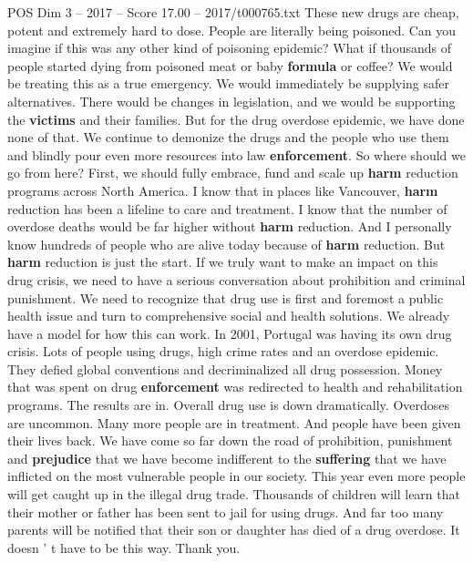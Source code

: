 \begin{textsample}{POS Dim 3 – 2017 – Score 17.00 – 2017/t000765.txt}
These new drugs are cheap, potent and extremely hard to dose.
People are literally being poisoned.
Can you imagine if this was any other kind of poisoning epidemic?
What if thousands of people started dying from poisoned meat or baby \textbf{formula} or coffee?
We would be treating this as a true emergency.
We would immediately be supplying safer alternatives.
There would be changes in legislation, and we would be supporting the \textbf{victims} and their families.
But for the drug overdose epidemic, we have done none of that.
We continue to demonize the drugs and the people who use them and blindly pour even more resources into law \textbf{enforcement}.
So where should we go from here?
First, we should fully embrace, fund and scale up \textbf{harm} reduction programs across North America.
I know that in places like Vancouver, \textbf{harm} reduction has been a lifeline to care and treatment.
I know that the number of overdose deaths would be far higher without \textbf{harm} reduction.
And I personally know hundreds of people who are alive today because of \textbf{harm} reduction.
But \textbf{harm} reduction is just the start.
If we truly want to make an impact on this drug crisis, we need to have a serious conversation about prohibition and criminal punishment.
We need to recognize that drug use is first and foremost a public health issue and turn to comprehensive social and health solutions.
We already have a model for how this can work.
In 2001, Portugal was having its own drug crisis.
Lots of people using drugs, high crime rates and an overdose epidemic.
They defied global conventions and decriminalized all drug possession.
Money that was spent on drug \textbf{enforcement} was redirected to health and rehabilitation programs.
The results are in.
Overall drug use is down dramatically.
Overdoses are uncommon.
Many more people are in treatment.
And people have been given their lives back.
We have come so far down the road of prohibition, punishment and \textbf{prejudice} that we have become indifferent to the \textbf{suffering} that we have inflicted on the most vulnerable people in our society.
This year even more people will get caught up in the illegal drug trade.
Thousands of children will learn that their mother or father has been sent to jail for using drugs.
And far too many parents will be notified that their son or daughter has died of a drug overdose.
It doesn ' t have to be this way.
Thank you.

\end{textsample}
